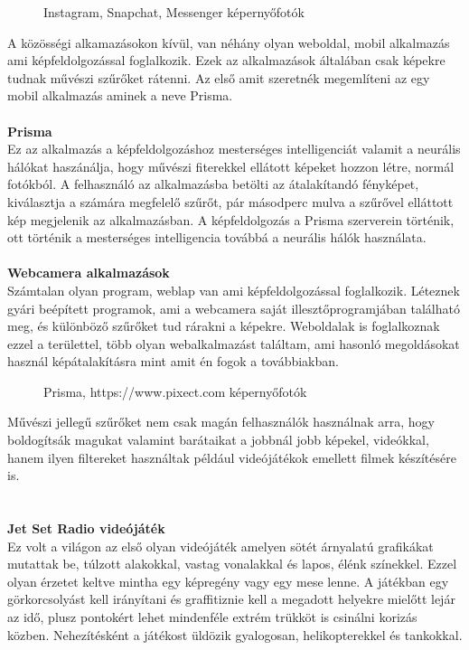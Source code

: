 \begin{figure}[ht]
\centering
{}
\caption{Instagram, Snapchat, Messenger képernyőfotók } 
\label{fig: instagram, snapchat, messenger}
\end{figure}
A közösségi alkamazásokon kívül, van néhány olyan weboldal, mobil alkalmazás ami képfeldolgozással foglalkozik. Ezek az alkalmazások általában csak képekre tudnak művészi szűrőket rátenni. Az első amit szeretnék megemlíteni az egy mobil alkalmazás aminek a neve Prisma. 
\\
\\ \textbf{Prisma}
\\
Ez az alkalmazás a képfeldolgozáshoz mesterséges intelligenciát valamit a neurális hálókat haszánálja, hogy művészi fiterekkel ellátott képeket hozzon létre, normál fotókból. A felhasználó az alkalmazásba betölti az átalakítandó fényképet, kiválasztja a számára megfelelő szűrőt, pár másodperc mulva a szűrővel elláttott kép megjelenik az alkalmazásban. A képfeldolgozás a Prisma szerverein történik, ott történik a mesterséges intelligencia továbbá a neurális hálók használata. %
\\
\\ \textbf{Webcamera alkalmazások} 
\\
Számtalan olyan program, weblap van ami képfeldolgozással foglalkozik. Léteznek gyári beépített programok, ami a webcamera saját illesztőprogramjában található meg, és különböző szűrőket tud rárakni a képekre. Weboldalak is foglalkoznak ezzel a területtel, több olyan webalkalmazást találtam, ami hasonló megoldásokat használ képátalakításra mint amit én fogok a továbbiakban.
\begin{figure}[ht]
\centering
{}
\caption{Prisma,  https://www.pixect.com képernyőfotók} 
\label{fig: JetSetRadio}
\end{figure}
Művészi jellegű szűrőket nem csak magán felhasználók használnak arra, hogy boldogítsák magukat valamint barátaikat a jobbnál jobb képekel, videókkal, hanem ilyen filtereket használtak például videójátékok emellett filmek készítésére is.
\\
\\
\\ \textbf{Jet Set Radio videójáték} 
\\
Ez volt a világon az első olyan videójáték amelyen sötét árnyalatú grafikákat mutattak be, túlzott alakokkal, vastag vonalakkal és lapos, élénk színekkel. Ezzel olyan érzetet keltve mintha egy képregény vagy egy mese lenne. A játékban egy görkorcsolyást kell irányítani és graffitiznie kell a megadott helyekre mielőtt lejár az idő, plusz pontokért lehet mindenféle extrém trükköt is csinálni korizás közben. Nehezítésként a játékost üldözik gyalogosan, helikopterekkel és tankokkal.%
